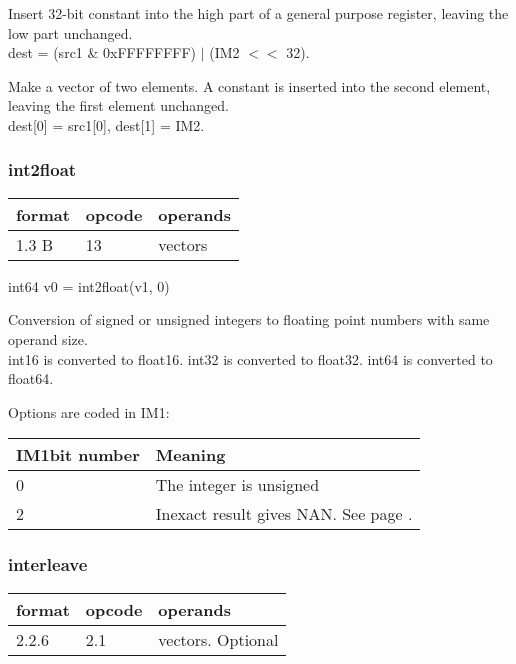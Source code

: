 \documentclass[forwardcom.tex]{subfiles}
\begin{document}
Insert 32-bit constant into the high part of a
general purpose register, leaving the low part
unchanged. \\
dest = (src1 \& 0xFFFFFFFF) $|$ (IM2 $<<$ 32).
\vspace{2mm}

Make a vector of two elements. A constant is inserted into the second element, leaving the first element unchanged.\\
dest[0] = src1[0], dest[1] = IM2.
\vspace{2mm}


\subsubsection{int2float}
\label{table:int2floatInstruction}
\begin{tabular}{|p{12mm}|p{12mm}|p{110mm}|}
\hline
\bfseries format & \bfseries opcode & \bfseries operands \\ \hline
1.3 B & 13 & vectors \\ \hline
\end{tabular}
\vspace{2mm}

int64 v0 = int2float(v1, 0)
\vspace{2mm}

Conversion of signed or unsigned integers to floating point numbers with same operand size.\\
int16 is converted to float16. int32 is converted to float32. int64 is converted to float64.
\vspace{2mm}

Options are coded in IM1:

\label{table:int2floatOptions}
\begin{tabular}{|p{20mm}|p{120mm}|}
\hline
\bfseries IM1\newline bit number & \bfseries Meaning \\ \hline
0 & The integer is unsigned \\
2 & Inexact result gives NAN. See page \pageref{table:FPExceptionResults}.
\\ \hline
\end{tabular}
\vspace{2mm}



\subsubsection{interleave}
\label{table:interleaveInstruction}
\begin{tabular}{|p{12mm}|p{12mm}|p{110mm}|}
\hline
\bfseries format & \bfseries opcode & \bfseries operands \\ \hline
2.2.6 & 2.1 & vectors. Optional \\ \hline
\end{tabular}
\vspace{2mm}
\end{document}
